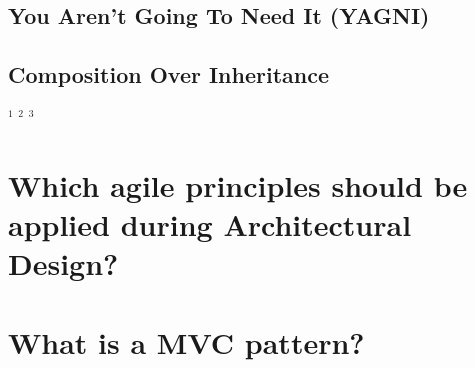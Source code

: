 \subsection{You Aren't Going To Need It (YAGNI)}
\subsection{Composition Over Inheritance}

\href{https://www.geeksforgeeks.org/principles-of-software-design/}{$^1$}
\href{https://swimm.io/learn/system-design/6-software-design-principles-used-by-successful-engineers}{$^2$}
\href{https://en.wikipedia.org/wiki/Software_architecture}{$^3$}

\section{Which agile principles should be applied during Architectural Design?}
\section{What is a MVC pattern?}

